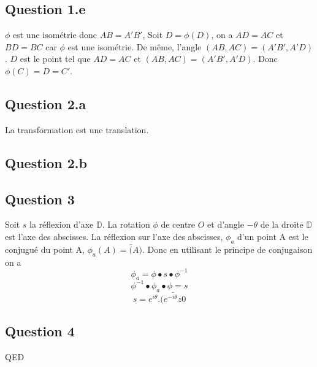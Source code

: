 \documentclass[]{book}
\theoremstyle{definition}
\newcommand{\bb}[1]{\mathbb{#1}}
\newcommand{\D}{\bb{D}}
\begin{document}
\subsection*{Question 1.e}
$\phi$ est une isom\'etrie donc $AB = A'B'$, Soit $D = \phi(D)$, on a $AD = AC$ et $BD = BC$ car $\phi$ est une isom\'etrie.
De m\^eme, l'angle $(AB, AC) = (A'B', A'D)$. $D$ est le point tel que $AD=AC$ et  $(AB, AC) = (A'B', A'D)$. Donc $\phi(C)=D=C'$.

\subsection*{Question 2.a}
La transformation est une translation.

\subsection*{Question 2.b}

\subsection*{Question 3}
Soit $s$ la r\'eflexion d'axe $\D$.
La rotation $\phi$ de centre $O$ et d'angle $-\theta$ de la droite $\D$ est l'axe des abscisses. La r\'eflexion sur l'axe des abscisses, $\phi_a$  d'un point A est le conjugu\'e du point A, $\phi_a(A) = \bar(A)$. Donc en utilisant le principe de conjugaison on a 
$$\phi_a = \phi \bullet s \bullet \phi^{-1}$$
$$\phi^{-1} \bullet \phi_a \bullet \phi = s$$
$$s = e^{i\theta}.\bar{(e^{-i\theta}z0}$$

\subsection*{Question 4}
 





QED
\end{document}
